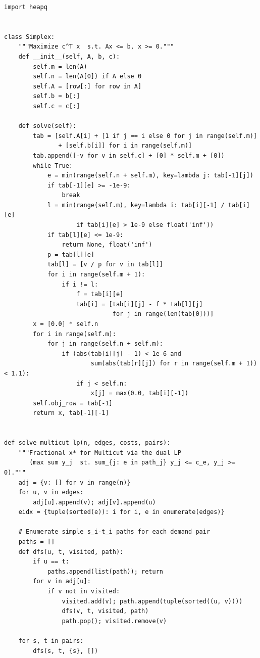 \begin{lstlisting}[style=python, caption=Multicut in General Graphs — Region Growing]
import heapq


class Simplex:
    """Maximize c^T x  s.t. Ax <= b, x >= 0."""
    def __init__(self, A, b, c):
        self.m = len(A)
        self.n = len(A[0]) if A else 0
        self.A = [row[:] for row in A]
        self.b = b[:]
        self.c = c[:]

    def solve(self):
        tab = [self.A[i] + [1 if j == i else 0 for j in range(self.m)]
               + [self.b[i]] for i in range(self.m)]
        tab.append([-v for v in self.c] + [0] * self.m + [0])
        while True:
            e = min(range(self.n + self.m), key=lambda j: tab[-1][j])
            if tab[-1][e] >= -1e-9:
                break
            l = min(range(self.m), key=lambda i: tab[i][-1] / tab[i][e]
                    if tab[i][e] > 1e-9 else float('inf'))
            if tab[l][e] <= 1e-9:
                return None, float('inf')
            p = tab[l][e]
            tab[l] = [v / p for v in tab[l]]
            for i in range(self.m + 1):
                if i != l:
                    f = tab[i][e]
                    tab[i] = [tab[i][j] - f * tab[l][j]
                              for j in range(len(tab[0]))]
        x = [0.0] * self.n
        for i in range(self.m):
            for j in range(self.n + self.m):
                if (abs(tab[i][j] - 1) < 1e-6 and
                        sum(abs(tab[r][j]) for r in range(self.m + 1)) < 1.1):
                    if j < self.n:
                        x[j] = max(0.0, tab[i][-1])
        self.obj_row = tab[-1]
        return x, tab[-1][-1]


def solve_multicut_lp(n, edges, costs, pairs):
    """Fractional x* for Multicut via the dual LP
       (max sum y_j  st. sum_{j: e in path_j} y_j <= c_e, y_j >= 0)."""
    adj = {v: [] for v in range(n)}
    for u, v in edges:
        adj[u].append(v); adj[v].append(u)
    eidx = {tuple(sorted(e)): i for i, e in enumerate(edges)}

    # Enumerate simple s_i-t_i paths for each demand pair
    paths = []
    def dfs(u, t, visited, path):
        if u == t:
            paths.append(list(path)); return
        for v in adj[u]:
            if v not in visited:
                visited.add(v); path.append(tuple(sorted((u, v))))
                dfs(v, t, visited, path)
                path.pop(); visited.remove(v)

    for s, t in pairs:
        dfs(s, t, {s}, [])


\end{lstlisting}

